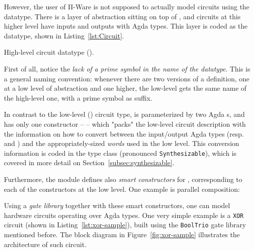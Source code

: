             However, the user of Π-Ware is not supposed to actually model circuits using the  datatype.
            There is a layer of abstraction sitting on top of ,
            and circuits at this higher level have inputs and outputs with Agda types.
            This layer is coded as the  datatype, shown in Listing~\ref{lst:Circuit}.

            \begin{listing}[ht]
                \caption{High-level circuit datatype ().\label{lst:Circuit}}
            \end{listing}

            First of all, notice the \emph{lack of a prime symbol in the name of the datatype}.
            This is a general naming convention:
            whenever there are two versions of a definition, one at a low level of abstraction and one higher,
            the low-level gets the same name of the high-level one, with a prime symbol as suffix.

            In contrast to the low-level () circuit type,  is parameterized by two Agda s,
            and has only one constructor –  – which "packs" the low-level circuit description
            with the information on how to convert between the input/output Agda types
            (resp.  and ) and the appropriately-sized \emph{words} used in the low level.
            This conversion information is coded in the  type class (pronounced \texttt{Synthesizable}),
            which is covered in more detail on Section~\ref{subsec:synthesizable}.

            Furthermore, the  module defines also \emph{smart constructors} for ,
            corresponding to each of the constructors at the low level.
            One example is parallel composition:

            \begin{center}
            \end{center}

            Using a \emph{gate library} together with these smart constructors, one can model
            hardware circuits operating over Agda types.
            One very simple example is a \texttt{XOR} circuit (shown in Listing~\ref{lst:xor-sample}),
            built using the \texttt{BoolTrio} gate library mentioned before.
            The block diagram in Figure~\ref{fig:xor-sample} illustrates the architecture of such circuit.

